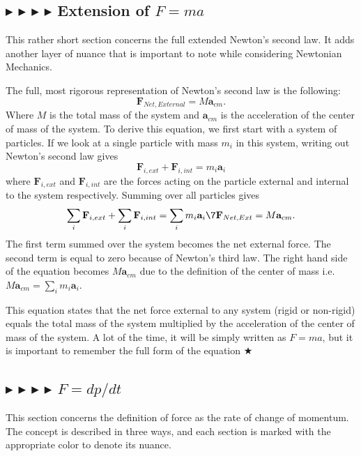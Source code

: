 %
%
\subsection{\color{OrangeRed} $\blacktriangleright$ \color{PineGreen} $\blacktriangleright$ \color{Goldenrod} $\blacktriangleright$ \color{Orchid} $\blacktriangleright$ \color{black} Extension of $F=ma$}
This rather short section concerns the full extended Newton's second law. It adds another layer of nuance that is important to note while considering Newtonian Mechanics.

\noindent The full, most rigorous representation of Newton's second law is the following:
\begin{equation}
    \boxed{\mathbf{F}_{Net, External} = M\mathbf{a}_{cm}}.
\end{equation}
\noindent Where $M$ is the total mass of the system and $\textbf{a}_{cm}$ is the acceleration of the center of mass of the system. To derive this equation, we first start with a system of particles. If we look at a single particle with mass $m_i$ in this system, writing out Newton's second law gives
\begin{equation}
    \mathbf{F}_{i,ext} + \mathbf{F}_{i,int} = m_i\mathbf{a}_i
\end{equation}
\noindent where $\mathbf{F}_{i,ext}$ and $\mathbf{F}_{i,int}$ are the forces acting on the particle external and internal to the system respectively. Summing over all particles gives
\begin{gather}
    \sum_i \mathbf{F}_{i,ext} + \sum_i \mathbf{F}_{i,int} = \sum_i m_i\mathbf{a}_i \7
    \mathbf{F}_{Net,Ext} = M\mathbf{a}_{cm}.
\end{gather}
\noindent The first term summed over the system becomes the net external force. The second term is equal to zero because of Newton's third law. The right hand side of the equation becomes $M\mathbf{a}_{cm}$ due to the definition of the center of mass i.e. $M\mathbf{a}_{cm} = \sum_i m_i\mathbf{a}_i$.

\noindent This equation states that the net force external to any system (rigid or non-rigid) equals the total mass of the system multiplied by the acceleration of the center of mass of the system. A lot of the time, it will be simply written as $F=ma$, but it is important to remember the full form of the equation $\bigstar$

%
%
\subsection{\color{OrangeRed} $\blacktriangleright$ \color{PineGreen} $\blacktriangleright$ \color{Goldenrod} $\blacktriangleright$ \color{Orchid} $\blacktriangleright$ \color{black} $F=dp/dt$}
\noindent This section concerns the definition of force as the rate of change of momentum. The concept is described in three ways, and each section is marked with the appropriate color to denote its nuance.

